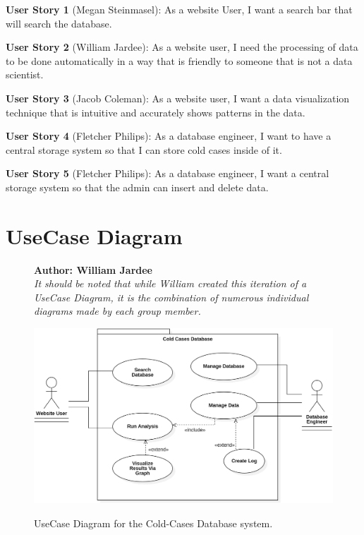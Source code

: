 \documentclass[11pt]{article}
\begin{document}
\noindent\textbf{\hypertarget{us1}{User Story 1}} (Megan Steinmasel):  As a website User, I want a search bar that will search the database.\vspace{0.5em}

\noindent\textbf{\hypertarget{us2}{User Story 2}} (William Jardee): As a website user, I need the processing of data to be done automatically in a way that is friendly to someone that is not a data scientist.\vspace{0.5em}

\noindent\textbf{\hypertarget{us3}{User Story 3}} (Jacob Coleman): As a website user, I want a data visualization technique that is intuitive and accurately shows patterns in the data.\vspace{0.5em}

\noindent\textbf{\hypertarget{us4}{User Story 4}} (Fletcher Philips): As a database engineer, I want to have a central storage system so that I can store cold cases inside of it. \vspace{0.5em}

\noindent\textbf{\hypertarget{us5}{User Story 5}} (Fletcher Philips): As a database engineer, I want a central storage system so that the admin can insert and delete data.\vspace{0.5em}

\clearpage



\section*{UseCase Diagram}

\begin{figure}[!ht]
\centering
\textbf{Author: William Jardee}\\
\textit{It should be noted that while William created this iteration of a UseCase Diagram, it is the combination of numerous individual diagrams made by each group member.}\vspace{0.5em}

	\includegraphics[width=.95\textwidth]{./UseCases/jardee_usecase_3}\\
	\caption{UseCase Diagram for the Cold-Cases Database system.}
	\label{fig:usecase_diagram}
\end{figure}
\clearpage
\end{document}
